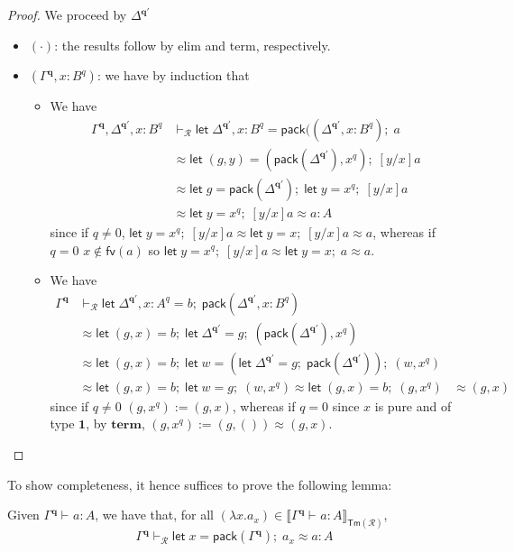 \documentclass[acmsmall,screen,anonymous,review]{acmart}
\newcommand{\mc}[1]{\ensuremath{\mathcal{#1}}}
\newcommand{\mb}[1]{\ensuremath{\mathbf{#1}}}
\newcommand{\ms}[1]{\ensuremath{\mathsf{#1}}}
\newcommand{\letexpr}[3]{\ensuremath{\ms{let}\;#1 = #2;\;#3}}
\newcommand{\hasty}[4]{#1 \vdash_{#2} #3: {#4}}
\newcommand{\teqv}{\approx}
\newcommand{\tmeq}[5]{#1 \vdash_{#2} #3 \teqv #4 : {#5}}
\newcommand{\brle}[1]{{\textsf{#1}}}
\newcommand{\dnt}[1]{\llbracket{#1}\rrbracket}
\begin{document}
\begin{proof}
  We proceed by $\Delta^{\mb{q}'}$
  \begin{itemize}
    \item $(\cdot)$: the results follow by \brle{elim} and \brle{term}, respectively.
    \item $(\Gamma^{\mb{q}}, x : B^q)$: we have by induction that
    \begin{itemize}
      \item We have
      \begin{align*}
      \Gamma^{\mb{q}}, \Delta^{\mb{q}'}, x : B^q 
      & \vdash_{\mc{R}} \letexpr{\Delta^{\mb{q}'}, x : B^q}
        {\ms{pack}((\Delta^{\mb{q}'}, x : B^q)}{a} \\
      & \approx \letexpr{(g, y)}{(\ms{pack}(\Delta^{\mb{q}'}), x^q)}{[y/x]a} \\
      & \approx \letexpr{g}{\ms{pack}(\Delta^{\mb{q}'})}{\letexpr{y}{x^q}{[y/x]a}} \\
      & \approx \letexpr{y}{x^q}{[y/x]a} \approx a : A
      \end{align*}
      since if $q \neq 0$, $\letexpr{y}{x^q}{[y/x]a} \approx \letexpr{y}{x}{[y/x]a} \approx a$,
      whereas if $q = 0$ $x \notin \ms{fv}(a)$ so $\letexpr{y}{x^q}{[y/x]a} \approx
      \letexpr{y}{x}{a} \approx a$.
      \item We have
      \begin{align*}
      \Gamma^{\mb{q}}
      & \vdash_{\mc{R}} \letexpr{\Delta^{\mb{q}'}, x : A^q}{b}{\ms{pack}(\Delta^{\mb{q}'}, x : B^q)} 
      \\
      & \approx \letexpr{(g, x)}{b}{\letexpr{\Delta^{\mb{q}'}}{g}
        {(\ms{pack}(\Delta^{\mb{q}'}), x^q)}} \\
      & \approx \letexpr{(g, x)}{b}{\letexpr{w}{
          (\letexpr{\Delta^{\mb{q}'}}{g}{\ms{pack}(\Delta^{\mb{q}'})})
        }{(w, x^q)}} \\
      & \approx \letexpr{(g, x)}{b}{\letexpr{w}{g}{(w, x^q)}} \approx \letexpr{(g, x)}{b}{(g, x^q)}
      & \approx (g, x)
      \end{align*}
      since if $q \neq 0$ $(g, x^q) := (g, x)$, whereas if $q = 0$ since $x$ is pure and of type
      $\mb{1}$, by $\mb{term}$, $(g, x^q) := (g, ()) \approx (g, x)$.
    \end{itemize}
  \end{itemize}
\end{proof}
To show completeness, it hence suffices to prove the following lemma:
\begin{lemma}
  Given $\hasty{\Gamma^{\mb{q}}}{}{a}{A}$, we have that, for all $(\lambda x. a_x) \in
  \dnt{\hasty{\Gamma^{\mb{q}}}{}{a}{A}}_{\ms{Tm}(\mc{R})}$,
  \begin{equation*}
    \tmeq{\Gamma^{\mb{q}}}{\mc{R
    }}{\letexpr{x}{\ms{pack}(\Gamma^{\mb{q}})}{a_x}}{a}{A}
  \end{equation*}
\end{lemma}
\end{document}
